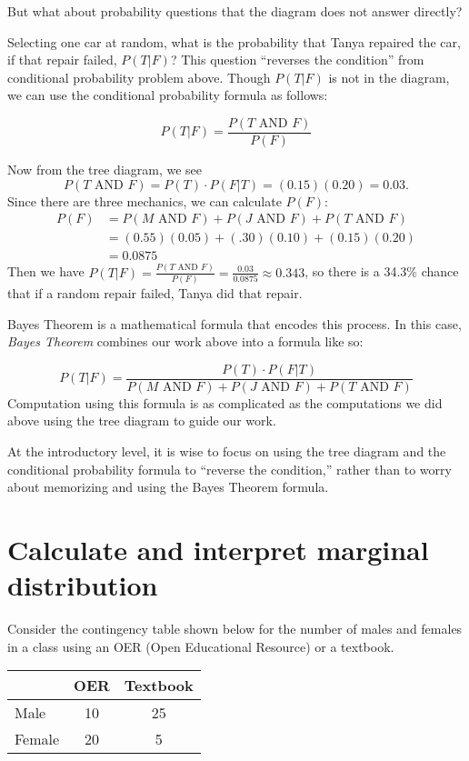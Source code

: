 But what about probability questions that the diagram does not answer directly? 

\begin{example}
Selecting one car at random, what is the probability that Tanya repaired the car, if that repair failed, \(P(T|F)\)? This question ``reverses the condition'' from conditional probability problem above. Though \(P(T|F)\) is not in the diagram, we can use the conditional probability formula as follows:

\[ P(T|F) = \frac{P(T \text{ AND } F)}{P(F)} \]

Now from the tree diagram, we see
\[P(T \text{ AND } F) = P(T) \cdot P(F|T) = (0.15)(0.20) = 0.03.\]
Since there are three mechanics, we can calculate \(P(F)\):
\begin{align*}
P(F) &= P(M \text{ AND } F) + P(J \text{ AND } F) + P(T \text{ AND } F) \\
        &= (0.55)(0.05) + (.30)(0.10) + (0.15)(0.20) \\
        &= 0.0875
\end{align*}
Then we have \(P(T|F) = \frac{P(T \text{ AND } F)}{P(F)} = \frac{0.03}{0.0875} \approx 0.343\), so there is a 34.3\% chance that if a random repair failed, Tanya did that repair.
\end{example}

Bayes Theorem is a mathematical formula that encodes this process. In this case, \emph{Bayes Theorem} combines our work above into a formula like so:

\[
P(T|F) = \frac{P(T) \cdot P(F|T) }{  P(M \text{ AND } F) + P(J \text{ AND } F) + P(T \text{ AND } F) }
\]
Computation using this formula is as complicated as the computations we did above using the tree diagram to guide our work. 

At the introductory level, it is wise to focus on using the tree diagram and the conditional probability formula to ``reverse the condition,'' rather than to worry about memorizing and using the Bayes Theorem formula.

\section{Calculate and interpret marginal distribution}

Consider the contingency table shown below for the number of males and females in a class using an OER (Open Educational Resource) or a textbook.

\begin{center}
\begin{tabular}{l|cc}
& OER & Textbook \\ \hline
Male & 10 & 25 \\
Female & 20 & 5	
\end{tabular}
\end{center}

